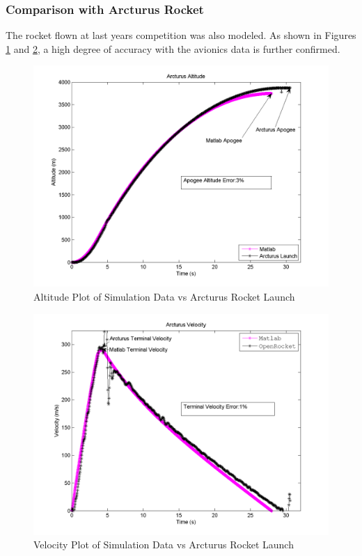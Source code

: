 \documentclass[]{article}
\begin{document}
\subsubsection{Comparison with Arcturus
Rocket}\label{comparison-with-arcturus-rocket}

The rocket flown at last years competition was also modeled. As shown in
Figures \ref{arc_experimental_comparison_altitude_label} and
\ref{arc_experimental_comparison_velocity_label}, a high degree of
accuracy with the avionics data is further confirmed.

\begin{figure}[htbp]
\centering
\includegraphics{images/plots/plot_arcturus_altitude_analysis.png}
\caption{Altitude Plot of Simulation Data vs Arcturus Rocket Launch
\label{arc_experimental_comparison_altitude_label}}
\end{figure}

\begin{figure}[htbp]
\centering
\includegraphics{images/plots/plot_arcturus_velocity_analysis.png}
\caption{Velocity Plot of Simulation Data vs Arcturus Rocket Launch
\label{arc_experimental_comparison_velocity_label}}
\end{figure}
\end{document}
